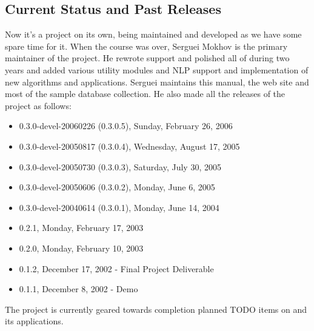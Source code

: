 \subsection{Current Status and Past Releases}

Now it's a project on its own, being maintained and developed as we have some spare time for it.
When the course was over, Serguei Mokhov is the primary maintainer of the
project. He rewrote  support and polished all of {\marf} during
two years and added various utility modules and NLP support and implementation of new
algorithms and applications. Serguei maintains this manual, the web site and most of
the sample database collection. He also made all the releases of the project
as follows:

\begin{itemize}
\item 0.3.0-devel-20060226 (0.3.0.5), Sunday, February 26, 2006
\item 0.3.0-devel-20050817 (0.3.0.4), Wednesday, August 17, 2005
\item 0.3.0-devel-20050730 (0.3.0.3), Saturday, July 30, 2005
\item 0.3.0-devel-20050606 (0.3.0.2), Monday, June 6, 2005
\item 0.3.0-devel-20040614 (0.3.0.1), Monday, June 14, 2004
\item 0.2.1, Monday, February 17, 2003
\item 0.2.0, Monday, February 10, 2003
\item 0.1.2, December 17, 2002 - Final Project Deliverable
\item 0.1.1, December 8, 2002 - Demo
\end{itemize}

\noindent
The project is currently geared towards completion planned TODO items on {\marf} and
its applications.

